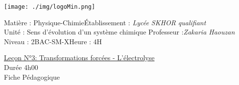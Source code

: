 \documentclass[12pt]{article}
\newcommand\headerMe[2]{\noindent{}#1\hfill#2}
\begin{document}
\begin{center}
\texttt{[image: ./img/logoMin.png]}
\vspace{-3cm}
\end{center}
\headerMe{Matière : Physique-Chimie}{Établissement : \emph{Lycée SKHOR qualifiant}}\\
\headerMe{ Unité :  Sens d'évolution d'un système chimique}{  Professeur :\emph{Zakaria Haouzan}}\\
\headerMe{Niveau : 2BAC-SM-X}{Heure : 4H}\\

\begin{center}
\underline{Leçon N°3: Transformations forcées - L'électrolyse }\\
Durée 4h00
\\
    \vspace{.2cm}
\hrulefill
\Large{Fiche Pédagogique}
\hrulefill\\
\end{center}


\end{document}
